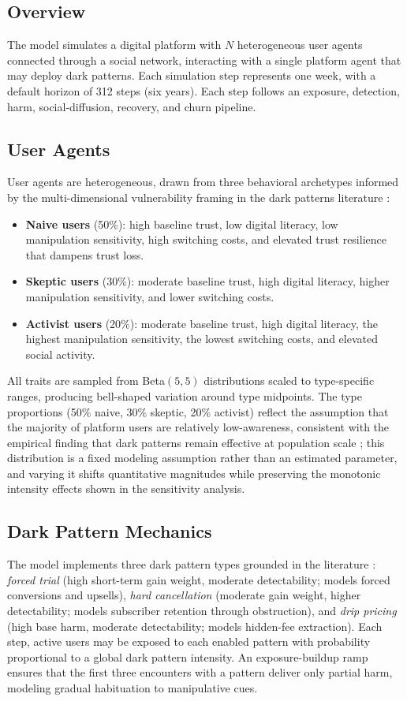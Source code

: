 \documentclass[a4paper]{article}
\begin{document}
\subsection{Overview}
The model simulates a digital platform with $N$ heterogeneous user agents connected through a social network, interacting with a single platform agent that may deploy dark patterns. Each simulation step represents one week, with a default horizon of 312  steps (six years). Each step follows an exposure, detection, harm, social-diffusion, recovery, and churn pipeline.

\subsection{User Agents}
User agents are heterogeneous, drawn from three behavioral archetypes informed by the multi-dimensional vulnerability framing in the dark patterns literature \citep{rossi2024}:
\begin{itemize}
\item \textbf{Naive users} (50\%): high baseline trust, low digital literacy, low manipulation sensitivity, high switching costs, and elevated trust resilience that dampens trust loss.
\item \textbf{Skeptic users} (30\%): moderate baseline trust, high digital literacy, higher manipulation sensitivity, and lower switching costs.
\item \textbf{Activist users} (20\%): moderate baseline trust, high digital literacy, the highest manipulation sensitivity, the lowest switching costs, and elevated social activity.
\end{itemize}
All traits are sampled from Beta$(5,5)$ distributions scaled to type-specific ranges, producing bell-shaped variation around type midpoints. The type proportions (50\% naive, 30\% skeptic, 20\% activist) reflect the assumption that the majority of platform users are relatively low-awareness, consistent with the empirical finding that dark patterns remain effective at population scale \citep{luguri2021}; this distribution is a fixed modeling assumption rather than an estimated parameter, and varying it shifts quantitative magnitudes while preserving the monotonic intensity effects shown in the sensitivity analysis.

\subsection{Dark Pattern Mechanics}
The model implements three dark pattern types grounded in the literature \citep{mathur2019,luguri2021}: \emph{forced trial} (high short-term gain weight, moderate detectability; models forced conversions and upsells), \emph{hard cancellation} (moderate gain weight, higher detectability; models subscriber retention through obstruction), and \emph{drip pricing} (high base harm, moderate detectability; models hidden-fee extraction). Each step, active users may be exposed to each enabled pattern with probability proportional to a global dark pattern intensity. An exposure-buildup ramp ensures that the first three encounters with a pattern deliver only partial harm, modeling gradual habituation to manipulative cues.
\end{document}
